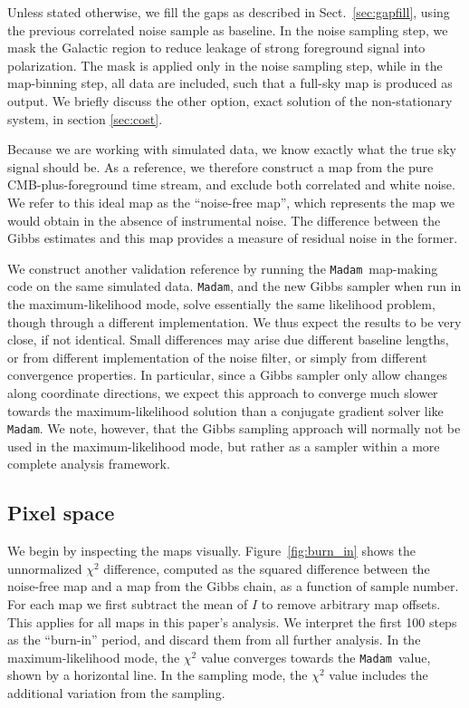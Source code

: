 \documentclass[twocolumn]{aa}
\newcommand{\Madam}{\texttt{Madam}}
\begin{document}
Unless stated otherwise, we fill the gaps as described in
Sect.~\ref{sec:gapfill}, using the previous correlated noise sample as
baseline. In the noise sampling step, we mask the Galactic region to
reduce leakage of strong foreground  signal into polarization.
The mask is applied only in the noise sampling step, while in the
map-binning step, all data are included, such that a full-sky map is
produced as output.
We briefly discuss the other option, exact solution of the non-stationary system,
in section \ref{sec:cost}.

Because we are working with simulated data, we know exactly what the
true sky signal should be.  As a reference, we therefore construct a
map from the pure CMB-plus-foreground time stream, and exclude both
correlated and white noise.  We refer to this ideal map as the ``noise-free
map'', which represents the map we would obtain in the absence of
instrumental noise.  The difference between the Gibbs estimates and
this map provides a measure of residual noise in the former.

We construct another validation reference by running the
\Madam\ map-making code on the same simulated data.  \Madam, and the
new Gibbs sampler when run in the maximum-likelihood mode, solve
essentially the same likelihood problem, though through a different
implementation.  We thus expect the results to be very close, if not
identical.  Small differences may arise due different baseline
lengths, or from different implementation of the noise filter, or
simply from different convergence properties. In particular, since a
Gibbs sampler only allow changes along coordinate directions, we
expect this approach to converge much slower towards the
maximum-likelihood solution than a conjugate gradient solver like
\Madam. We note, however, that the Gibbs sampling approach will
normally not be used in the maximum-likelihood mode, but rather as a
sampler within a more complete analysis framework.


\subsection{Pixel space}


We begin by inspecting the maps visually.
Figure~\ref{fig:burn_in} shows the unnormalized $\chi^2$ difference,
computed as the squared difference between the noise-free map and a map from the Gibbs chain, as a function of sample number.
For each map we first subtract the mean of $I$ to remove arbitrary map offsets. 
This applies for all maps in this paper's analysis.
We interpret the first 100 steps as the ``burn-in'' period, and discard them from all further analysis.
In the maximum-likelihood mode, the $\chi^2$ value converges towards the \Madam\ value,
shown by a horizontal line.  In the sampling mode, the $\chi^2$ value includes the additional variation from 
the sampling.
\end{document}
